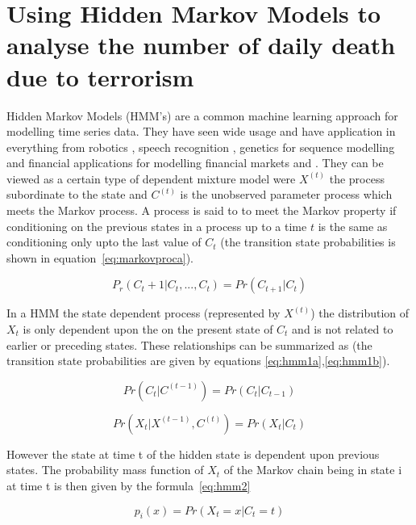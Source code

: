 \section{Using Hidden Markov Models to analyse the number of daily death due to terrorism}

Hidden Markov Models (HMM's) are a common machine learning approach for modelling time series data. They have seen wide usage and have application in everything from robotics \citep{ladd2005robotics}, speech recognition \citep{gales1998maximum}, genetics for sequence modelling \citep{sonnhammer1998pfam} and financial applications for modelling financial markets \citep{gales1998maximum} and \citep{park2009forecasting}. They can be viewed as a certain type of dependent mixture model were $X^(t)$ the process subordinate to the state and $C^(t)$ is the unobserved parameter process which meets the Markov process. A process is said to to meet the Markov property if conditioning on the previous states in a process up to a time $t$ is the same as conditioning only upto the last value of $C_t$ (the transition state probabilities is shown in equation~\ref{eq:markovproca}).

\begin{equation} P_r(C_t+1|C_t,...,C_t)=Pr(C_{t+1}|C_t)  \label{eq:markovproca}  \end{equation}

In a HMM the state dependent process (represented by $X^(t)$) the distribution of $X_t$ is only dependent upon the on the present state of $C_t$ and is not related to earlier or preceding states. These relationships can be summarized as (the transition state probabilities are given by equations \ref{eq:hmm1a},\ref{eq:hmm1b}).

\begin{equation} Pr(C_t|C^{(t-1)})=Pr(C_t|C_{t-1})  \label{eq:hmm1a}  \end{equation}

\begin{equation} Pr(X_t|X^{(t-1)},C^{(t)})=Pr(X_t|C_{t})   \label{eq:hmm1b}  \end{equation}

However the state at time t of the  hidden state is dependent upon previous states. The probability mass function of $X_t$ of the Markov chain being in state i at time t is then given by the formula~\ref{eq:hmm2} 

\begin{equation} p_{i}(x)=Pr(X_{t}=x|C_{t}=t)  \label{eq:hmm2}  \end{equation}

